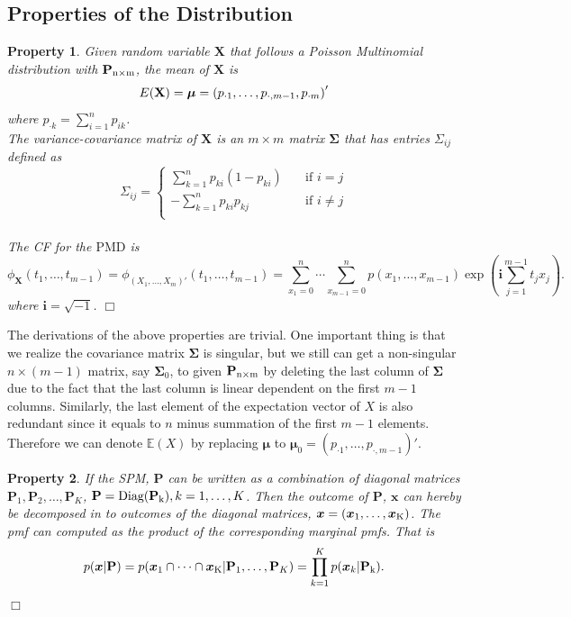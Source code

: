 \documentclass[12pt]{article}
\newcommand{\EE}{\mathbb{E}}
\newcommand{\Xmat}{\mathbf{X}}
\newcommand{\Pmat}{\mathbf{P}}
\newcommand{\ivec}{{\boldsymbol{i}}}
\newcommand{\diag}{\textrm{Diag}}
\newcommand{\PMD}{\textrm{PMD}}
\newcommand{\xvec}{\boldsymbol{x}}
\newcommand{\qedw}{\hfill \ensuremath{\Box}}
\newtheorem{ppt}{Property}
\begin{document}
\subsection{Properties of the Distribution}
\begin{ppt}\normalfont
Given random variable $\Xmat$ that follows a Poisson Multinomial distribution with $\Pmat_{\rm n\times m}$, the mean of $\Xmat$ is
   $$\\E(\Xmat) = \boldsymbol{\mu} = \left( p_{\cdot1} ,\dots,p_{\cdot,m-1},p_{\cdot m}\right)'$$ where $p_{\cdot k} = \sum_{i=1}^{n}p_{i k}$.\\
The variance-covariance matrix of $\Xmat$ is an $m \times m$ matrix $\boldsymbol{\Sigma}$ that has entries $\Sigma_{ij}$ defined as
\begin{equation*}
   \Sigma_{ij} =
           \begin{cases}
             \sum_{k=1}^{n}p_{ki}(1-p_{ki}) & \quad \text{if } i=j\\
             -\sum_{k=1}^{n}p_{ki}p_{kj} & \quad \text{if } i \neq j\\
           \end{cases}
\end{equation*}\\
The CF for the $\PMD$ is
\begin{equation*}
\phi_{\Xmat}(t_1, \dots, t_{m-1}) = \phi_{(X_1,\dots,X_m)'}(t_1, \dots, t_{m-1})  =  \sum_{x_1 = 0}^{n}\cdots \sum_{x_{m-1} = 0}^n p(x_1,\ldots,x_{m-1})\exp\left(\ivec\sum_{j=1}^{m-1}t_jx_j\right).
\end{equation*}
where  $\ivec=\sqrt{-1}$.
\qedw
\end{ppt}
The derivations of the above properties are trivial. One important thing is that we realize the covariance matrix $\boldsymbol{\Sigma}$ is singular, but we still can get a non-singular $n \times (m-1)$ matrix, say $\boldsymbol{\Sigma}_{0}$, to given $\Pmat_{\rm n \times m}$ by deleting the last column of $\boldsymbol{\Sigma}$ due to the fact that the last column is linear dependent on the first $m-1$ columns. Similarly, the last element of the expectation vector of $X$ is also redundant since it equals to $n$ minus summation of the first $m-1$ elements. Therefore we can denote $\EE(X)$ by replacing $\boldsymbol{\mu}$ to $\boldsymbol{\mu}_0 = \left( p_{\cdot1} ,\dots,p_{\cdot,m-1}\right)'$.

\begin{ppt}\normalfont
If the SPM, $\Pmat$ can be written as a combination of diagonal matrices $\Pmat_1, \Pmat_2, \dots, \Pmat_{K}$, $\Pmat = \diag(\Pmat_{\rm k}), k=1,\dots,K$. Then the outcome of $\Pmat$, $\boldsymbol{x}$ can hereby be decomposed in to  outcomes of the diagonal matrices, $\xvec= (\xvec_{1},\dots,\xvec_{\rm K})$. The pmf can computed as the product of the corresponding marginal pmfs. That is
\begin{align*}
p(\xvec|\Pmat)= p(\xvec_{1} \cap \dots \cap \xvec_{\rm K}|\Pmat_1,\dots,\Pmat_{K} )= \prod_{k=1}^K p(\xvec_{k}|\Pmat_{\rm k}).
\end{align*}
\qedw
\end{ppt}
\end{document}
